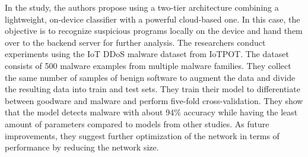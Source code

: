 \documentclass[conference, 11pt]{IEEEtran}
\begin{document}
In the study, the authors propose using a two-tier architecture combining a lightweight, on-device classifier with a powerful cloud-based one.
In this case, the objective is to recognize suspicious programs locally on the device and hand them over to the backend server for further analysis.
The researchers conduct experiments using the IoT DDoS malware dataset from IoTPOT. The dataset consists of 500 malware examples from multiple malware families.
They collect the same number of samples of benign software to augment the data and divide the resulting data into train and test sets.
They train their model to differentiate between goodware and malware and perform five-fold cross-validation.
They show that the model detects malware with about 94\% accuracy while having the least amount of parameters compared to models from other studies.
As future improvements, they suggest further optimization of the network in terms of performance by reducing the network size.
\end{document}
